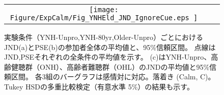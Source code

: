 
\begin{figure}[t]
  
  
  \begin{tabular}{ccc}
  
  \begin{minipage} {0.32\hsize}
  \centering
  \texttt{[image: Figure/ExpCalm/Fig\_YNHEld\_JND\_IgnoreCue.eps ]}
  \end{minipage}&
  
  \begin{minipage} {0.32\hsize}
  \centering
  \includegraphics [ width = 1\columnwidth]{Figure/ExpCalm/Fig_YNHEld_PSE_IgnoreCue.eps }
  \end{minipage}&

  \begin{minipage} {0.32\hsize}
  \centering
  \includegraphics [ width = 1\columnwidth]{Figure/ExpCalm/Fig2c_CalEmoYNHEld_JNDNHHL_Mean4_Thrsh22dB.eps }
  \end{minipage}
  

  \end{tabular}
  
  \vspace {-6pt}
  \caption{実験条件（YNH-Unpro,YNH-80yr,Older-Unpro）ごとにおけるJND(a)とPSE(b)の参加者全体の平均値と、95\%信頼区間。
            点線はJND,PSEそれぞれの全条件の平均値を示す。
            (c)はYNH-Unpro、高齢健聴群（ONH）、高齢者難聴群（OHL）のJNDの平均値と95\%信頼区間。
            各3組のバーグラフは感情対に対応。落着き (Calm, C)。
            Tukey HSDの多重比較検定（有意水準 5\%）の結果も示す。}
  
  \label{fig:JNDPSE_Calm}

  \end{figure}


